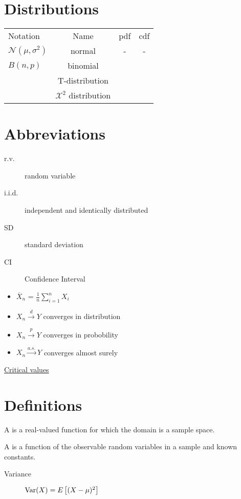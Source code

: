 
\section{Distributions}

\begin{tabular}{ l c c c }

 Notation & Name & pdf & cdf \\
 $\mathcal{N}(\mu, \sigma^2)$ & normal & - & - \\
 $B(n, p)$ & binomial \\
 & T-distribution \\
 & $\mathcal{X}^2$ distribution \\

\end{tabular}


\section{Abbreviations}

\begin{description}
\item[r.v.] random variable
\item[i.i.d.] independent and identically distributed
\item[SD] standard deviation
\item[CI] Confidence Interval
\end{description}

\begin{itemize}
\item $\overline{X}_n$ = $\frac{1}{n}\sum_{i=1}^n X_i$
\item $X_n\xrightarrow{d} Y$ converges in distribution
\item $X_n\xrightarrow{p} Y$ converges in probobility
\item $X_n\xrightarrow{a.s.} Y$ converges almost surely
\end{itemize}

\href{https://en.wikipedia.org/wiki/Notation_in_probability_and_statistics#Critical_values}{Critical values}


\section{Definitions}

A  is a real-valued function for which the domain is a sample space.

A  is a function of the observable random variables in a sample and known constants.

\begin{description}
\item[Variance] $\mathrm{Var}(X) = E\left[(X-\mu)^2\right]$
\end{description}

